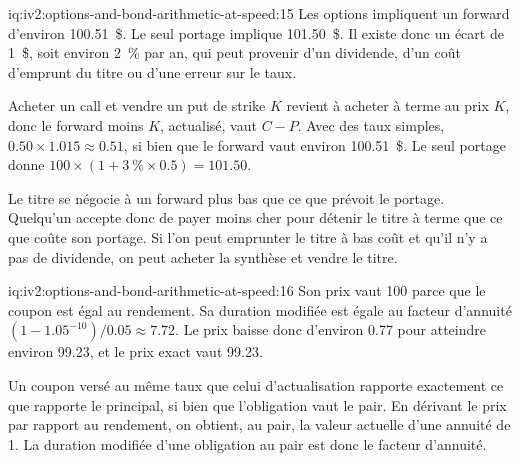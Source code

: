 \begin{solution}{iq:iv2:options-and-bond-arithmetic-at-speed:15}
Les options impliquent un forward d'environ 100.51~\$. Le seul portage implique 101.50~\$. Il existe donc un écart de 1~\$, soit environ 2~\% par an, qui peut provenir d'un dividende, d'un coût d'emprunt du titre ou d'une erreur sur le taux.

Acheter un call et vendre un put de strike $K$ revient à acheter à terme au prix $K$, donc le forward moins $K$, actualisé, vaut $C - P$. Avec des taux simples, $0.50 \times 1.015 \approx 0.51$, si bien que le forward vaut environ 100.51~\$. Le seul portage donne $100 \times (1 + 3~\% \times 0.5) = 101.50$.

Le titre se négocie à un forward plus bas que ce que prévoit le portage. Quelqu'un accepte donc de payer moins cher pour détenir le titre à terme que ce que coûte son portage. Si l'on peut emprunter le titre à bas coût et qu'il n'y a pas de dividende, on peut acheter la synthèse et vendre le titre.

\end{solution}

\begin{solution}{iq:iv2:options-and-bond-arithmetic-at-speed:16}
Son prix vaut 100 parce que le coupon est égal au rendement. Sa duration modifiée est égale au facteur d'annuité $(1 - 1.05^{-10})/0.05 \approx 7.72$. Le prix baisse donc d'environ 0.77 pour atteindre environ 99.23, et le prix exact vaut 99.23.

Un coupon versé au même taux que celui d'actualisation rapporte exactement ce que rapporte le principal, si bien que l'obligation vaut le pair. En dérivant le prix par rapport au rendement, on obtient, au pair, la valeur actuelle d'une annuité de 1. La duration modifiée d'une obligation au pair est donc le facteur d'annuité.

\end{solution}

